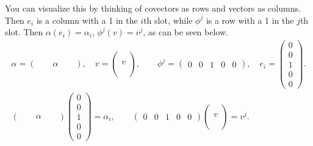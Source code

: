 You can visualize this by thinking of covectors as rows and vectors as columns. Then $e_i $ is a column with a 1 in the $i$th slot, while $\phi^j $ is a row with a 1 in the $j$th slot. Then $\alpha (e_i )=\alpha _i$, $\phi^j (v)=v^j $, as can be seen below.
\begin{gather*}
\alpha =
\begin{pmatrix}
    & & \alpha & &
\end{pmatrix},\quad v=
\begin{pmatrix}
    \\
    \\
    v\\
\\
\\
\end{pmatrix},\qquad \phi^j =
\begin{pmatrix}
    0 & 0 & 1 & 0 & 0
\end{pmatrix},\quad e_i =
\begin{pmatrix}
    0 \\ 0 \\ 1 \\ 0 \\ 0
\end{pmatrix}.\\
\begin{pmatrix}
    & & \alpha  & &
\end{pmatrix}
\begin{pmatrix}
    0 \\ 0 \\1\\0\\0
\end{pmatrix}=\alpha _i ,\qquad
\begin{pmatrix}
    0&0&1&0&0
\end{pmatrix}
\begin{pmatrix}
    \\ \\ v \\ \\ \\
\end{pmatrix}=v^j .
\end{gather*}

